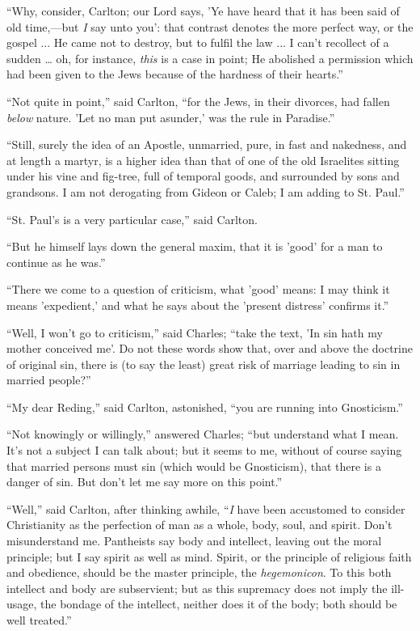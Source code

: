 ``Why, consider, Carlton; our Lord says, 'Ye have heard that it
has been said of old time,—but \emph{I} say unto you': that contrast
denotes the more perfect way, or the gospel ... He came not to
destroy, but to fulfil the law ... I can't recollect of a sudden …
oh, for instance, \emph{this} is a case in point; He abolished a
permission which had been given to the Jews because of the hardness of
their hearts.''

``Not quite in point,'' said Carlton, ``for the Jews,
in their divorces, had fallen \emph{below} nature. 'Let no man put
asunder,' was the rule in Paradise.''

``Still, surely the idea of an Apostle, unmarried, pure,
in fast and nakedness, and at length a martyr, is a higher idea than
that of one of the old Israelites sitting under his vine and fig-tree,
full of temporal goods, and surrounded by sons and grandsons. I am not
derogating from Gideon or Caleb; I am adding to St. Paul.''

``St. Paul's is a very particular case,'' said Carlton.

``But he himself lays down the general maxim, that it is 'good'
for a man to continue as he was.''

``There we come to a question of criticism, what 'good' means:
I may think it means 'expedient,' and what he says about the 'present
distress' confirms it.''

``Well, I won't go to criticism,'' said Charles; ``take
the text, 'In sin hath my mother conceived me'. Do not these words
show that, over and above the doctrine of original sin, there is (to
say the least) great risk of marriage leading to sin in married
people?''

``My dear Reding,'' said Carlton, astonished, ``you are
running into Gnosticism.''

``Not knowingly or willingly,'' answered Charles; ``but
understand what I mean. It's not a subject I can talk about; but it
seems to me, without of course saying that married persons must sin
(which would be Gnosticism), that there is a danger of sin. But don't
let me say more on this point.''

``Well,'' said Carlton, after thinking awhile, ``\emph{I}
have been accustomed to consider Christianity as the perfection of man
as a whole, body, soul, and spirit. Don't misunderstand me. Pantheists
say body and intellect, leaving out the moral principle; but I say
spirit as well as mind. Spirit, or the principle of religious
faith and obedience, should be the master principle, the \emph{hegemonicon}.
To this both intellect and body are subservient; but as this supremacy
does not imply the ill-usage, the bondage of the intellect, neither
does it of the body; both should be well treated.''

